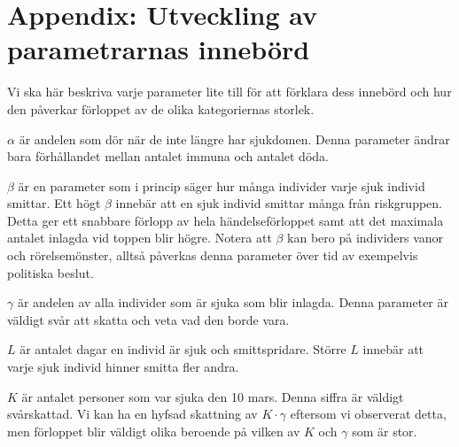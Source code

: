 \documentclass[a4paper, 12pt]{article}
\theoremstyle{definition}
\begin{document}
\newpage
\section{Appendix: Utveckling av parametrarnas innebörd}
Vi ska här beskriva varje parameter lite till för att förklara dess innebörd och hur den påverkar förloppet av de olika kategoriernas storlek.

$\alpha$ är andelen som dör när de inte längre har sjukdomen. Denna parameter ändrar bara förhållandet mellan antalet immuna och antalet döda.

$\beta$ är en parameter som i princip säger hur många individer varje sjuk individ smittar. Ett högt $\beta$ innebär att en sjuk individ smittar många från riskgruppen. Detta ger ett snabbare förlopp av hela händelseförloppet samt att det maximala antalet inlagda vid toppen blir högre. Notera att $\beta$ kan bero på individers vanor och rörelsemönster, alltså påverkas denna parameter över tid av exempelvis politiska beslut.

$\gamma$ är andelen av alla individer som är sjuka som blir inlagda. Denna parameter är väldigt svår att skatta och veta vad den borde vara.

$L$ är antalet dagar en individ är sjuk och smittspridare. Större $L$ innebär att varje sjuk individ hinner smitta fler andra.

$K$ är antalet personer som var sjuka den 10 mars. Denna siffra är väldigt svårskattad. Vi kan ha en hyfsad skattning av $K\cdot\gamma$ eftersom vi observerat detta, men förloppet blir väldigt olika beroende på vilken av $K$ och $\gamma$ som är stor.
\end{document}
